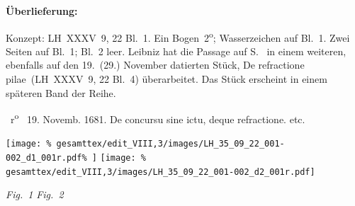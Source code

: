 %  
%
%
\frenchspacing
%
\begin{ledgroupsized}[r]{120mm}
\footnotesize
\pstart
\noindent\textbf{Überlieferung:}
\pend
\end{ledgroupsized}
%
\begin{ledgroupsized}[r]{114mm}
\footnotesize
\pstart \parindent -6mm
%
Konzept:
LH~XXXV~9, 22 Bl.~1.
Ein Bogen~2\textsuperscript{o};
Wasserzeichen auf Bl.~1.
Zwei Seiten auf Bl.~1; Bl.~2 leer.
Leibniz hat die Passage auf S.~ in einem weiteren, ebenfalls auf den 19.\ (29.) November datierten Stück, \glqq De refractione pilae\grqq\ (LH~XXXV~9, 22 Bl.~4) überarbeitet. Das Stück erscheint in einem späteren Band der Reihe.
\pend
\end{ledgroupsized}
%
\frenchspacing
%
\vspace{8mm}
\pstart%
\normalsize%
\noindent%
~r\textsuperscript{o}\rbrack\
\pend
%
\pstart
\noindent%
\raggedleft
%
%
%
19. Novemb. 1681.
\pend
%
\pstart
\centering%
De concursu sine ictu,%
\protect{}
%
deque refractione.\protect{} etc.%
\edlabel{35_09_22_001-002_1b}
\pend%
\vspace{0.5em}
%
\vspace{1.5em} %
\centerline{%
\texttt{[image: \%
gesamttex/edit\_VIII,3/images/LH\_35\_09\_22\_001-002\_d1\_001r.pdf\%
]}%
\hspace*{25mm}%
\texttt{[image: \%
gesamttex/edit\_VIII,3/images/LH\_35\_09\_22\_001-002\_d2\_001r.pdf]}%
}
\vspace{0.5em}
\centerline{%
\hspace*{5mm}\lbrack\textit{Fig.~1}\rbrack \hspace*{40mm} \lbrack\textit{Fig.~2}\rbrack\hspace*{0mm}%
}
\vspace{1.5em}
